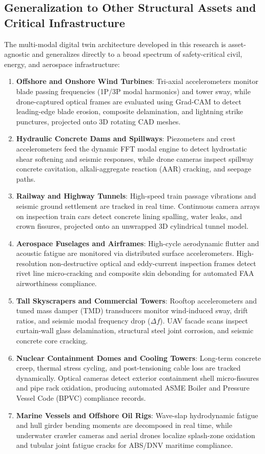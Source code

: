\documentclass[10pt, conference, letterpaper]{IEEEtran}
\begin{document}
\subsection{Generalization to Other Structural Assets and Critical Infrastructure}
The multi-modal digital twin architecture developed in this research is asset-agnostic and generalizes directly to a broad spectrum of safety-critical civil, energy, and aerospace infrastructure:
\begin{enumerate}
    \item \textbf{Offshore and Onshore Wind Turbines}: Tri-axial accelerometers monitor blade passing frequencies (1P/3P modal harmonics) and tower sway, while drone-captured optical frames are evaluated using Grad-CAM to detect leading-edge blade erosion, composite delamination, and lightning strike punctures, projected onto 3D rotating CAD meshes.
    \item \textbf{Hydraulic Concrete Dams and Spillways}: Piezometers and crest accelerometers feed the dynamic FFT modal engine to detect hydrostatic shear softening and seismic responses, while drone cameras inspect spillway concrete cavitation, alkali-aggregate reaction (AAR) cracking, and seepage paths.
    \item \textbf{Railway and Highway Tunnels}: High-speed train passage vibrations and seismic ground settlement are tracked in real time. Continuous camera arrays on inspection train cars detect concrete lining spalling, water leaks, and crown fissures, projected onto an unwrapped 3D cylindrical tunnel model.
    \item \textbf{Aerospace Fuselages and Airframes}: High-cycle aerodynamic flutter and acoustic fatigue are monitored via distributed surface accelerometers. High-resolution non-destructive optical and eddy-current inspection frames detect rivet line micro-cracking and composite skin debonding for automated FAA airworthiness compliance.
    \item \textbf{Tall Skyscrapers and Commercial Towers}: Rooftop accelerometers and tuned mass damper (TMD) transducers monitor wind-induced sway, drift ratios, and seismic modal frequency drop ($\Delta f$). UAV facade scans inspect curtain-wall glass delamination, structural steel joint corrosion, and seismic concrete core cracking.
    \item \textbf{Nuclear Containment Domes and Cooling Towers}: Long-term concrete creep, thermal stress cycling, and post-tensioning cable loss are tracked dynamically. Optical cameras detect exterior containment shell micro-fissures and pipe rack oxidation, producing automated ASME Boiler and Pressure Vessel Code (BPVC) compliance records.
    \item \textbf{Marine Vessels and Offshore Oil Rigs}: Wave-slap hydrodynamic fatigue and hull girder bending moments are decomposed in real time, while underwater crawler cameras and aerial drones localize splash-zone oxidation and tubular joint fatigue cracks for ABS/DNV maritime compliance.
\end{enumerate}
\end{document}
